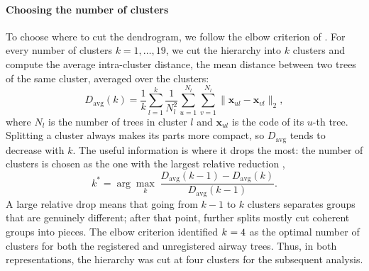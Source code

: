 \paragraph{Choosing the number of clusters}  %
To choose where to cut the dendrogram, we follow the elbow criterion of
\citet{norouzi2024volpam}. For every number of clusters $k = 1, \dots, 19$, we cut the hierarchy
into $k$ clusters and compute the average intra-cluster distance, the mean distance between two
trees of the same cluster, averaged over the clusters:
\begin{equation}
  D_{\mathrm{avg}}(k) = \frac{1}{k} \sum_{l=1}^{k}
     \frac{1}{N_l^2} \sum_{u=1}^{N_l} \sum_{v=1}^{N_l}
     \big\|\mathbf{x}_{ul} - \mathbf{x}_{vl}\big\|_2 ,
  \label{eq:davg}                        %
\end{equation}
where $N_l$ is the number of trees in cluster $l$ and $\mathbf{x}_{ul}$ is the code of its
$u$-th tree. Splitting a cluster always makes its parts more compact, so $D_{\mathrm{avg}}$ tends
to decrease with $k$. The useful information is where it drops the most: the number of
clusters is chosen as the one with the largest relative reduction \cite{norouzi2024volpam},
\begin{equation}
  k^{*} = \arg\max_{k}\;
          \frac{D_{\mathrm{avg}}(k-1) - D_{\mathrm{avg}}(k)}{D_{\mathrm{avg}}(k-1)} .
  \label{eq:kstar}                       %
\end{equation}
A large relative drop means that going from $k-1$ to $k$ clusters separates groups that are
genuinely different; after that point, further splits mostly cut coherent groups into pieces.
The elbow criterion identified $k^{\*}=4$ as the optimal number of clusters for both the registered and unregistered airway trees. Thus, in both representations, the hierarchy was cut at four clusters for the subsequent analysis.